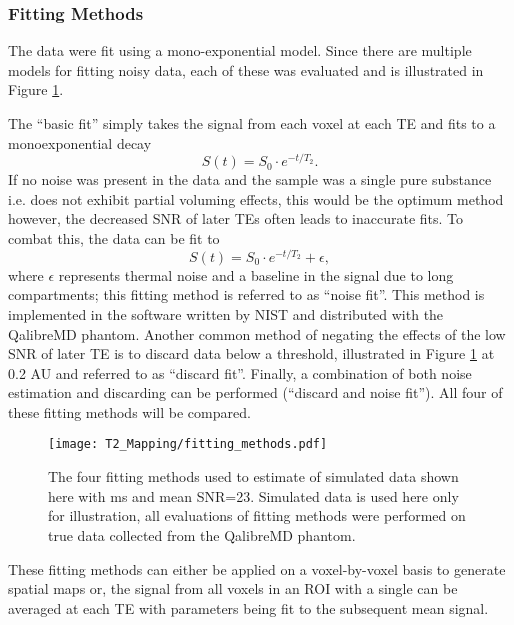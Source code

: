 \subsubsection{\ttwo Fitting Methods}

The data were fit using a mono-exponential model. Since there are multiple models for fitting noisy data, each of these was evaluated and is illustrated in Figure \ref{fig:t2_fitting_methods}. 

The ``basic fit'' simply takes the signal from each voxel at each \ac{TE} and fits to a monoexponential decay 
\begin{equation}
	S(t) = S_0 \cdot e^{-t/T_2}.
	\label{eq:t2}
\end{equation}
If no noise was present in the data and the sample was a single pure substance i.e. does not exhibit partial voluming effects, this would be the optimum method however, the decreased \ac{SNR} of later \acp{TE} often leads to inaccurate fits. To combat this, the data can be fit to
\begin{equation}
	S(t) = S_0 \cdot e^{-t/T_2} + \epsilon,
	\label{eq:t2_noise}
\end{equation}
where $\epsilon$ represents thermal noise and a baseline in the signal due to long \ttwo compartments; this fitting method is referred to as ``noise fit''. This method is implemented in the software written by \ac{NIST} and distributed with the QalibreMD phantom. Another common method of negating the effects of the low \ac{SNR} of later \ac{TE} is to discard data below a threshold, illustrated in Figure \ref{fig:t2_fitting_methods} at 0.2 AU and referred to as ``discard fit''. Finally, a combination of both noise estimation and discarding can be performed (``discard and noise fit''). All four of these fitting methods will be compared.

\begin{figure}[H]
	\centering
	\texttt{[image: T2\_Mapping/fitting\_methods.pdf]}
	\caption{The four fitting methods used to estimate \ttwo of simulated data shown here with  ms and mean \ac{SNR}=23. Simulated data is used here only for illustration, all evaluations of fitting methods were performed on true data collected from the QalibreMD phantom.}
	\label{fig:t2_fitting_methods}	
\end{figure}

These fitting methods can either be applied on a voxel-by-voxel basis to generate spatial maps or, the signal from all voxels in an \ac{ROI} with a single \ttwo can be averaged at each \ac{TE} with parameters being fit to the subsequent mean signal. 

